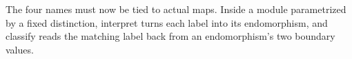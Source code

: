 \documentclass[11pt,a4paper]{book}
\def\texttt#1{#1}%
\begin{document}
The four names must now be tied to actual maps. Inside a module
parametrized by a fixed distinction, \texttt{interpret} turns each label
into its endomorphism, and \texttt{classify} reads the matching label back
from an endomorphism's two boundary values.

\begin{code}%
\>[0]\AgdaSpace{}%
\AgdaSpace{}%
\AgdaSymbol{(}\AgdaSpace{}%
\AgdaSymbol{:}\AgdaSpace{}%
\AgdaSymbol{)}\AgdaSpace{}%
\<%
\\
\>[0][@{}l@{\AgdaIndent{0}}]%
\>[2]\AgdaSpace{}%
\AgdaSymbol{:}\AgdaSpace{}%
\<%
\\
%
\>[2]\AgdaSpace{}%
\AgdaSymbol{=}\AgdaSpace{}%
\AgdaSpace{}%
\AgdaSpace{}%
\AgdaSpace{}%
\AgdaSpace{}%
\<%
\\
%
\\[\AgdaEmptyExtraSkip]%
%
\>[2]\AgdaSpace{}%
\AgdaSymbol{:}\AgdaSpace{}%
\AgdaSymbol{\{}\AgdaSpace{}%
\AgdaSymbol{:}\AgdaSpace{}%
\AgdaSymbol{\}}\AgdaSpace{}%
\AgdaSpace{}%
\AgdaSpace{}%
\AgdaSpace{}%
\<%
\\
%
\>[2]\AgdaSpace{}%
\AgdaSpace{}%
\AgdaSymbol{=}\AgdaSpace{}%
\<%
\\
%
\\[\AgdaEmptyExtraSkip]%
%
\>[2]\AgdaSpace{}%
\AgdaSymbol{:}\AgdaSpace{}%
\AgdaSymbol{\{}\AgdaSpace{}%
\AgdaSpace{}%
\AgdaSymbol{:}\AgdaSpace{}%
\AgdaSymbol{\}}\AgdaSpace{}%
\AgdaSpace{}%
\AgdaSpace{}%
\AgdaSpace{}%
\AgdaSpace{}%
\AgdaSpace{}%
\AgdaSpace{}%
\AgdaSpace{}%
\<%
\\
%
\>[2]\AgdaSpace{}%
\AgdaSpace{}%
\AgdaSpace{}%
\AgdaSymbol{=}\AgdaSpace{}%
\AgdaSpace{}%
\AgdaSymbol{(}\AgdaSpace{}%
\AgdaSymbol{)}\<%
\\
%
\\[\AgdaEmptyExtraSkip]%
%
\>[2]\AgdaSpace{}%
\AgdaSymbol{:}\AgdaSpace{}%
\AgdaSymbol{\{}\AgdaSpace{}%

\end{code}
\end{document}
